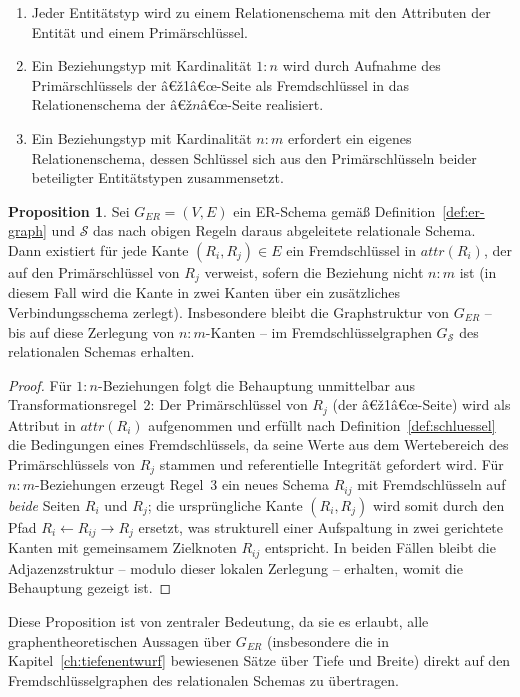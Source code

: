 ﻿\documentclass[a4paper,12pt]{report}
\theoremstyle{definition}
\newtheorem{proposition}[theorem]{Proposition}
\theoremstyle{remark}
\newcommand{\att}{\mathit{attr}}
\begin{document}
\begin{enumerate}
  \item Jeder Entitätstyp wird zu einem Relationenschema mit den
    Attributen der Entität und einem Primärschlüssel.
  \item Ein Beziehungstyp mit Kardinalität $1{:}n$ wird durch Aufnahme
    des Primärschlüssels der â€ž1â€œ-Seite als Fremdschlüssel in das
    Relationenschema der â€ž$n$â€œ-Seite realisiert.
  \item Ein Beziehungstyp mit Kardinalität $n{:}m$ erfordert ein eigenes
    Relationenschema, dessen Schlüssel sich aus den Primärschlüsseln
    beider beteiligter Entitätstypen zusammensetzt.
\end{enumerate}

\begin{proposition}
\label{prop:er-rel-graph}
Sei $G_{ER}=(V,E)$ ein ER-Schema gemäß Definition~\ref{def:er-graph} und
$\mathcal{S}$ das nach obigen Regeln daraus abgeleitete relationale
Schema. Dann existiert für jede Kante $(R_i,R_j)\in E$ ein
Fremdschlüssel in $\att(R_i)$, der auf den Primärschlüssel von $R_j$
verweist, sofern die Beziehung nicht $n{:}m$ ist (in diesem Fall wird
die Kante in zwei Kanten über ein zusätzliches Verbindungsschema
zerlegt). Insbesondere bleibt die Graphstruktur von $G_{ER}$ -- bis auf
diese Zerlegung von $n{:}m$-Kanten -- im Fremdschlüsselgraphen
$G_{\mathcal{S}}$ des relationalen Schemas erhalten.
\end{proposition}

\begin{proof}
Für $1{:}n$-Beziehungen folgt die Behauptung unmittelbar aus
Transformationsregel~2: Der Primärschlüssel von $R_j$ (der â€ž1â€œ-Seite)
wird als Attribut in $\att(R_i)$ aufgenommen und erfüllt nach
Definition~\ref{def:schluessel} die Bedingungen eines Fremdschlüssels,
da seine Werte aus dem Wertebereich des Primärschlüssels von $R_j$
stammen und referentielle Integrität gefordert wird. Für $n{:}m$-Beziehungen
erzeugt Regel~3 ein neues Schema $R_{ij}$ mit Fremdschlüsseln auf
\emph{beide} Seiten $R_i$ und $R_j$; die ursprüngliche Kante
$(R_i,R_j)$ wird somit durch den Pfad $R_i \leftarrow R_{ij} \rightarrow R_j$
ersetzt, was strukturell einer Aufspaltung in zwei gerichtete Kanten mit
gemeinsamem Zielknoten $R_{ij}$ entspricht. In beiden Fällen bleibt die
Adjazenzstruktur -- modulo dieser lokalen Zerlegung -- erhalten, womit die
Behauptung gezeigt ist.
\end{proof}

Diese Proposition ist von zentraler Bedeutung, da sie es erlaubt, alle
graphentheoretischen Aussagen über $G_{ER}$ (insbesondere die in
Kapitel~\ref{ch:tiefenentwurf} bewiesenen Sätze über Tiefe und Breite)
direkt auf den Fremdschlüsselgraphen des relationalen Schemas zu
übertragen.
\end{document}
